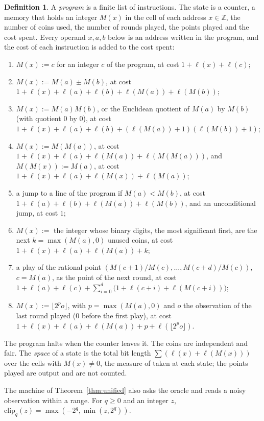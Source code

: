 \documentclass[11pt]{amsart}
\theoremstyle{definition}
\newtheorem{definition}[theorem]{Definition}
\numberwithin{equation}{section}
\begin{document}
\begin{definition}\label{def:bitram}
A \emph{program} is a finite list of instructions. The state is a counter, a memory that holds an integer $M(x)$ in the cell of each address $x\in\mathbb Z$, the number of coins used, the number of rounds played, the points played and the cost spent. Every operand $x,a,b$ below is an address written in the program, and the cost of each instruction is added to the cost spent:
\begin{enumerate}[label=(\roman*)]
\item $M(x):=c$ for an integer $c$ of the program, at cost $1+\ell(x)+\ell(c)$;
\item $M(x):=M(a)\pm M(b)$, at cost $1+\ell(x)+\ell(a)+\ell(b)+\ell(M(a))+\ell(M(b))$;
\item $M(x):=M(a)M(b)$, or the Euclidean quotient of $M(a)$ by $M(b)$ (with quotient $0$ by $0$), at cost $1+\ell(x)+\ell(a)+\ell(b)+(\ell(M(a))+1)(\ell(M(b))+1)$;
\item $M(x):=M(M(a))$, at cost $1+\ell(x)+\ell(a)+\ell(M(a))+\ell(M(M(a)))$, and $M(M(x)):=M(a)$, at cost $1+\ell(x)+\ell(a)+\ell(M(x))+\ell(M(a))$;
\item a jump to a line of the program if $M(a)<M(b)$, at cost $1+\ell(a)+\ell(b)+\ell(M(a))+\ell(M(b))$, and an unconditional jump, at cost $1$;
\item $M(x):=$ the integer whose binary digits, the most significant first, are the next $k=\max(M(a),0)$ unused coins, at cost $1+\ell(x)+\ell(a)+\ell(M(a))+k$;
\item a play of the rational point $(M(c+1)/M(c),\dots,M(c+d)/M(c))$, $c=M(a)$, as the point of the next round, at cost $1+\ell(a)+\ell(c)+\sum_{i=0}^d\bigl(1+\ell(c+i)+\ell(M(c+i))\bigr)$;
\item $M(x):=\lfloor2^po\rfloor$, with $p=\max(M(a),0)$ and $o$ the observation of the last round played ($0$ before the first play), at cost $1+\ell(x)+\ell(a)+\ell(M(a))+p+\ell(\lfloor2^po\rfloor)$.
\end{enumerate}
The program halts when the counter leaves it. The coins are independent and fair. The \emph{space} of a state is the total bit length $\sum(\ell(x)+\ell(M(x)))$ over the cells with $M(x)\ne0$, the measure of \cite[Section~2.2.3]{vEB90} taken at each state; the points played are output and are not counted.
\end{definition}

The machine of Theorem~\ref{thm:unified} also asks the oracle and reads a noisy observation within a range. For $q\ge0$ and an integer $z$, $\mathrm{clip}_q(z)=\max(-2^q,\min(z,2^q))$.
\end{document}
